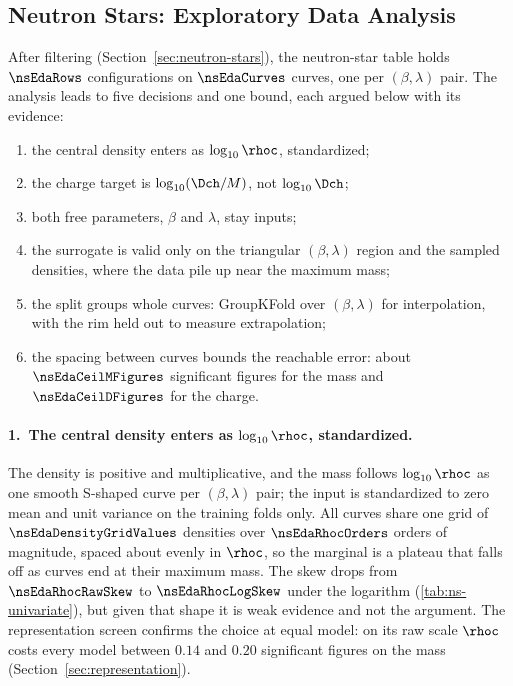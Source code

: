 \subsection{Neutron Stars: Exploratory Data Analysis}
\label{sec:eda-ns}

After filtering (Section~\ref{sec:neutron-stars}), the neutron-star table holds $\nsEdaRows$ configurations on $\nsEdaCurves$ curves, one per $(\beta, \lambda)$ pair. The analysis leads to five decisions and one bound, each argued below with its evidence:
\begin{enumerate}
  \item the central density enters as $\log_{10}\rhoc$, standardized;
  \item the charge target is $\log_{10}(\Dch/M)$, not $\log_{10}\Dch$;
  \item both free parameters, $\beta$ and $\lambda$, stay inputs;
  \item the surrogate is valid only on the triangular $(\beta, \lambda)$ region and the sampled densities, where the data pile up near the maximum mass;
  \item the split groups whole curves: GroupKFold over $(\beta, \lambda)$ for interpolation, with the rim held out to measure extrapolation;
  \item the spacing between curves bounds the reachable error: about $\nsEdaCeilMFigures$ significant figures for the mass and $\nsEdaCeilDFigures$ for the charge.
\end{enumerate}

\paragraph{1.\ The central density enters as $\log_{10}\rhoc$, standardized.}
The density is positive and multiplicative, and the mass follows $\log_{10}\rhoc$ as one smooth S-shaped curve per $(\beta, \lambda)$ pair; the input is standardized to zero mean and unit variance on the training folds only. All curves share one grid of $\nsEdaDensityGridValues$ densities over $\nsEdaRhocOrders$ orders of magnitude, spaced about evenly in $\rhoc$, so the marginal is a plateau that falls off as curves end at their maximum mass. The skew drops from $\nsEdaRhocRawSkew$ to $\nsEdaRhocLogSkew$ under the logarithm (\cref{tab:ns-univariate}), but given that shape it is weak evidence and not the argument.
The representation screen confirms the choice at equal model: on its raw scale $\rhoc$ costs every model between $0.14$ and $0.20$ significant figures on the mass (Section~\ref{sec:representation}).

